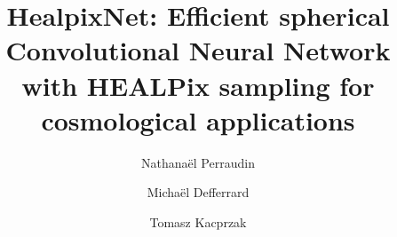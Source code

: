 \documentclass[final,twocolumn,3p,times,authoryear]{elsarticle}
\newcommand{\1}{\b{1}}              %
\newcommand{\0}{\b{0}}              %
\begin{document}
\begin{frontmatter}



\title{HealpixNet: Efficient spherical Convolutional Neural Network with HEALPix sampling for cosmological applications}


\author[SDSC]{Nathanaël Perraudin}
\author[EPFL]{Michaël Defferrard}
\author[ETHZ]{Tomasz Kacprzak}

\address[SDSC]{Swiss Data Science Center (SDSC), Zurich, Switzerland}
\address[EPFL]{Institute of Electrical Engineering, EPFL, Lausanne, Switzerland}
\address[ETHZ]{Institute for Particle Physics and Astrophysics, ETHZ, Zurich, Switzerland}

\begin{abstract}



\end{abstract}
\end{frontmatter}
\end{document}

